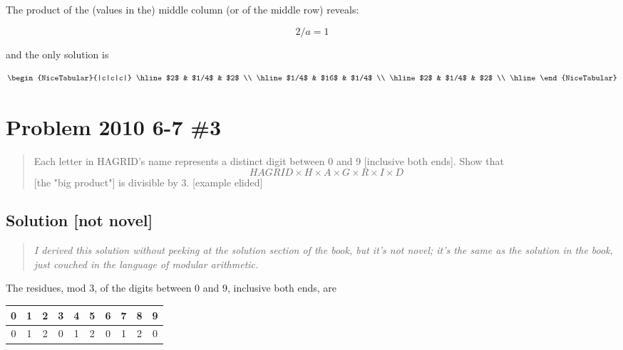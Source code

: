 \documentclass{article}
\begin{document}
\noindent The product of the (values in the) middle column (or of the middle row) reveals:

\begin{equation}
    2/a = 1
\end{equation}

\noindent and the only solution is 

\begin{equation}
\label{eqn:2010-6-7-2-1-unique-solution}
\begin{NiceTabular}{|c|c|c|}
    \hline
    $2$   & $1/4$ &   $2$  \\ \hline  
    $1/4$ & $16$  & $1/4$  \\ \hline
    $2$   & $1/4$ &   $2$  \\ \hline  
\end{NiceTabular}
\end{equation}

\section{Problem 2010 6-7 \#3}

\begin{framed}
\begin{quote}
    Each letter in HAGRID's name represents a  distinct digit between 0 and 9 [inclusive both ends]. Show that 
    \begin{equation}
        HAGRID\times{}H\times{}A\times{}G\times{}R\times{}I\times{}D
    \end{equation}
    [the "big product"] is divisible by 3. [example elided]
\end{quote}
\end{framed}

\subsection{Solution [not novel]}

\begin{quote}
\emph{I derived this solution without peeking at the solution section of the book, but it's not novel; it's the same as the solution in the book, just couched in the language of modular arithmetic.}
\end{quote}

The residues, mod 3, of the digits between 0 and 9, inclusive both ends, are

\begin{tabular}{cccccccccc}
     0 & 1 & 2 & 3 & 4 & 5 & 6 & 7 & 8 & 9  \\ \hline
     0 & 1 & 2 & 0 & 1 & 2 & 0 & 1 & 2 & 0
\end{tabular} 
\end{document}
